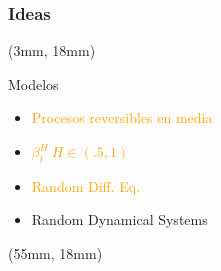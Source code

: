 \begin{frame}[plain]
    \frametitle{}
\end{frame}
\begin{frame}
    \frametitle{Ideas}
        \begin{textblock*}{50mm}(3mm, 18mm)
            \begin{bluebox}{Modelos}
                \begin{itemize}
                        \item
                            \textcolor<1>{orange}{
                                Procesos
                                reversibles
                                en media
                            }
                        \item
                            \textcolor<2>{orange}{
                                $
                                    \beta_t^H \ H \in (\num{.5}, 1)
                                $
                            }
                        \item
                            \textcolor<3>{orange}{
                                Random Diff. Eq.
                            }
                        \item
                            Random Dynamical Systems
                \end{itemize}
            \end{bluebox}
        \end{textblock*}
        \begin{textblock*}{72mm}(55mm, 18mm)
           \begin{graybox}{
                }
\end{graybox}
\end{textblock*}
\end{frame}
